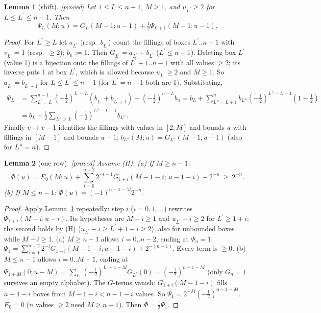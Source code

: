 \documentclass[10pt]{amsart}
\newcommand{\grade}[1]{\textsf{[#1]}}
\newcommand{\pr}{^{\prime}}
\newtheorem{lem}{Lemma}[section]
\theoremstyle{remark}
\begin{document}
\begin{lem}[shift]\label{lem94}\grade{proved}
Let $1\le L\le n-1$, $M\ge1$, and $u_{L\pr}\ge2$ for $L\le L\pr\le n-1$. Then
\[\Psi_L(M;u)=G_L(M-1;u-1)+\tfrac12\Psi_{L+1}(M-1;u-1).\]
\end{lem}
\begin{proof}
For $L\pr\ge L$ let $a_{L\pr}$ (resp.\ $b_{L\pr}$) count the fillings of boxes $L\pr..n-1$ with $v_{L\pr}=1$ (resp.\ $\ge2$);
$b_n:=1$. Then $G_{L\pr}=a_{L\pr}+b_{L\pr}$ ($L\pr\le n-1$). Deleting box $L\pr$ (value 1) is a bijection onto the fillings
of $L\pr+1..n-1$ with all values $\ge2$; its inverse puts 1 at box $L\pr$, which is allowed because $u_{L\pr}\ge2$ and
$M\ge1$. So $a_{L\pr}=b_{L\pr+1}$ for $L\le L\pr\le n-1$ (for $L\pr=n-1$ both are 1). Substituting,
\begin{align*}
\Psi_L&=\sum_{L\pr=L}^{n-1}(-\tfrac12)^{L\pr-L}(b_{L\pr}+b_{L\pr+1})+(-\tfrac12)^{n-L}b_n
=b_L+\sum_{L''=L+1}^{n}b_{L''}(-\tfrac12)^{L''-L-1}(1-\tfrac12)\\
&=b_L+\tfrac12\sum_{L''>L}(-\tfrac12)^{L''-L-1}b_{L''}.
\end{align*}
Finally $v\mapsto v-1$ identifies the fillings with values in $[2,M]$ and bounds $u$ with fillings in $[M-1]$ and bounds
$u-1$: $b_{L''}(M;u)=G_{L''}(M-1;u-1)$ (also for $L''=n$).
\end{proof}

\begin{lem}[one row]\label{lem95}\grade{proved}
Assume (H). (a) If $M\ge n-1$:
\[\Phi(u)=E_0(M;u)+\sum_{i=0}^{n-2}2^{-i-1}G_{1+i}(M-1-i;\,u-1-i)+2^{-n}\ \ge\ 2^{-n}.\]
(b) If $M\le n-1$: $\Phi(u)=(-1)^{n-1-M}2^{-n}$.
\end{lem}
\begin{proof}
Apply Lemma~\ref{lem94} repeatedly: step $i$ ($i=0,1,\dots$) rewrites $\Psi_{1+i}(M-i;u-i)$. Its hypotheses are $M-i\ge1$
and $u_{L\pr}-i\ge2$ for $L\pr\ge1+i$; the second holds by (H) ($u_{L\pr}-i\ge L\pr+1-i\ge2$), also for unbounded boxes while
$M-i\ge1$. (a) $M\ge n-1$ allows $i=0..n-2$, ending at $\Psi_n=1$:
$\Psi_1=\sum_{i=0}^{n-2}2^{-i}G_{1+i}(M-1-i;u-1-i)+2^{-(n-1)}$. Every term is $\ge0$. (b) $M\le n-1$ allows $i=0..M-1$,
ending at $\Psi_{1+M}(0;u-M)=\sum_{L\pr}(-\tfrac12)^{L\pr-1-M}G_{L\pr}(0)=(-\tfrac12)^{n-1-M}$ (only $G_n=1$ survives an empty
alphabet). The $G$-terms vanish: $G_{1+i}(M-1-i)$ fills $n-1-i$ boxes from $M-1-i<n-1-i$ values. So
$\Psi_1=2^{-M}(-\tfrac12)^{n-1-M}$. $E_0=0$ ($n$ values $\ge2$ need $M\ge n+1$). Then $\Phi=\tfrac12\Psi_1$.
\end{proof}
\end{document}

